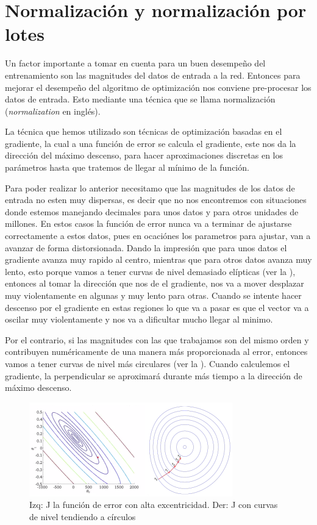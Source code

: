 \section{Normalización y normalización por lotes}

Un factor importante a tomar en cuenta para un buen desempeño del entrenamiento son las magnitudes del datos de entrada a la red. Entonces para mejorar el desempeño del algoritmo de optimización nos conviene pre-procesar los datos de entrada. Esto mediante una técnica que se llama normalización (\emph{normalization} en inglés).

La técnica que hemos utilizado son técnicas de optimización basadas en el gradiente, la cual a una función de error se calcula el gradiente, este nos da la dirección del máximo descenso, para  hacer aproximaciones discretas en los parámetros hasta que tratemos de llegar al mínimo de la función.
 
Para poder realizar lo anterior necesitamo que las magnitudes de los datos de entrada no esten muy dispersas, es decir que no nos encontremos con situaciones donde estemos manejando decimales para unos datos y para otros unidades de millones. En estos casos la función de error nunca va a terminar de ajustarse correctamente a estos datos, pues en ocaciónes los parametros para ajustar, van a avanzar de forma distorsionada. Dando la impresión que para unos datos el gradiente avanza muy rapido al centro, mientras que para otros datos avanza muy lento, esto porque vamos a tener curvas de nivel demasiado elípticas (ver la ), entonces al tomar la dirección que nos de el gradiente, nos va a mover desplazar muy violentamente en algunas y muy lento para otras. Cuando se intente hacer descenso por el gradiente en estas regiones lo que va a pasar es que el vector va a oscilar muy violentamente y  nos va a dificultar mucho llegar al minimo.

Por el contrario, si las magnitudes con las que trabajamos son del mismo orden y contribuyen numéricamente de una manera más proporcionada al error, entonces vamos a tener curvas de nivel  más circulares (ver la ). Cuando calculemos el gradiente, la perpendicular se aproximará durante más tiempo a la dirección de máximo descenso. 

\begin{figure}[H]
 \centering
 \includegraphics[scale=0.5]{../Figuras/curvasDeNivel.png}
 \caption{Izq: J la función de error con alta excentricidad. Der: J con curvas de nivel tendiendo a círculos}
 \label{fig:curvasNivel}
\end{figure}


